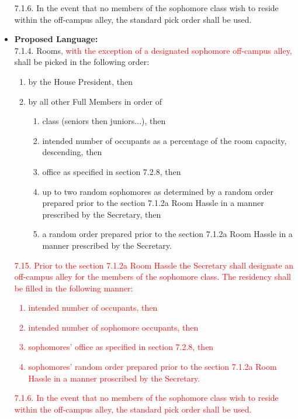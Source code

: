 \documentclass[10pt]{article} %
\begin{document}
\begin{itemize}
	7.1.6. In the event that no members of the sophomore class wish to reside within the off-campus alley, the standard pick order shall be used.
	
	\item \textbf{Proposed Language:} \\
	7.1.4. Rooms\textcolor{red}{, with the exception of a designated sophomore off-campus alley,} shall be picked in the following order: 
	\begin{enumerate}[label=(\alph*)]
		\item by the House President, then 
		\item by all other Full Members in order of 
		\begin{enumerate}[label=(\roman*)]
			\item class (seniors then juniors...), then 
			\item intended number of occupants as a percentage of the room capacity, descending, then 
			\item office as specified in section 7.2.8, then 
			\item up to two random sophomores as determined by a random order prepared prior to the section 7.1.2a Room Hassle in a manner prescribed by the Secretary, then 
			\item a random order prepared prior to the section 7.1.2a Room Hassle in a manner prescribed by the Secretary.
		\end{enumerate}
	\end{enumerate}
	\textcolor{red}{
		7.15. Prior to the section 7.1.2a Room Hassle the Secretary shall designate an off-campus alley for the members of the sophomore class. The residency shall be filled in the following manner: 
		\begin{enumerate}[label=(\alph*)]
			\item intended number of occupants, then 
			\item intended number of sophomore occupants, then 
			\item sophomores’ office as specified in section 7.2.8, then 
			\item sophomores’ random order prepared prior to the section 7.1.2a Room Hassle in a manner proscribed by the Secretary. 
		\end{enumerate}
	}
	\textcolor{red}{
		7.1.6. In the event that no members of the sophomore class wish to reside within the off-campus alley, the standard pick order shall be used.
	}
\end{itemize}
\end{document}
